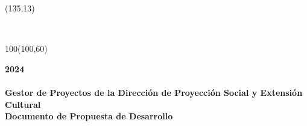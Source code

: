 \usetikzlibrary{calc}
\begin{titlepage}
    \centering

    \begin{figure}[h]
    \end{figure}
    
    \begin{textblock}{70}(135,13)
        \begin{flushright}
            {\large{\textcolor{white}{Dirección de Proyección Social y Extensión Cultural}}}\\
        \end{flushright} 
    \end{textblock}

    \begin{textblock}{100}(100,60)
        \begin{flushright}
            {\Huge{\textbf{2024}}}\\[20pt]
            {\fontsize{50}{60}\selectfont\textbf{\MakeUppercase{\genseg}}}\\[20pt]
            {\large{\textbf{Gestor de Proyectos de la Dirección de Proyección Social y Extensión Cultural}}}\\[15pt]
            {\Large{\textbf{Documento de Propuesta de Desarrollo}}}\\[15pt]
        \end{flushright} 
    \end{textblock}


\end{titlepage}
